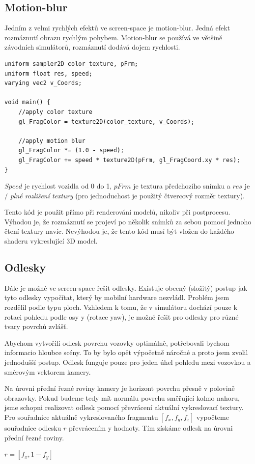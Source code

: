 \documentclass[11pt,twoside,a4paper]{book}
\begin{document}
\subsection{Motion-blur}
Jedním z velmi rychlých efektů ve screen-space je motion-blur. Jedná efekt rozmáznutí obrazu rychlým pohybem. Motion-blur se používá ve většině závodních simulátorů, rozmáznutí dodává dojem rychlosti.
\lstset{language=GLSL} 
\begin{lstlisting}[caption=Motion blur fragment shader dle rychlosti vozidla]
uniform sampler2D color_texture, pFrm;
uniform float res, speed;
varying vec2 v_Coords;

void main() {
	//apply color texture
	gl_FragColor = texture2D(color_texture, v_Coords); 

	//apply motion blur
	gl_FragColor *= (1.0 - speed);
	gl_FragColor += speed * texture2D(pFrm, gl_FragCoord.xy * res);
}
\end{lstlisting}

$Speed$ je rychlost vozidla od 0 do 1, $pFrm$ je textura předchozího snímku a $res$ je / \textit{plné rozlišení textury} (pro jednoduchost je použitý čtvercový rozměr textury).

Tento kód je použit přímo při renderování modelů, nikoliv při postprocesu. Výhodou je, že rozmáznutí se projeví po několik snímků za sebou pomocí jednoho čtení textury navíc. Nevýhodou je, že tento kód musí být vložen do každého shaderu vykreslující 3D model.
\newpage

\subsection{Odlesky}
Dále je možné ve screen-space řešit odlesky. Existuje obecný (složitý) postup jak tyto odlesky vypočítat, který by mobilní hardware nezvládl. Problém jsem rozdělil podle typu ploch. Vzhledem k tomu, že v simulátoru dochází pouze k rotaci pohledu podle osy y (rotace yaw), je možné řešit pro odlesky pro různé tvary povrchů zvlášť.

Abychom vytvořili odlesk povrchu vozovky optimálně, potřebovali bychom informaci\linebreak o hloubce scény. To by bylo opět výpočetně náročné a proto jsem zvolil jednodušší postup. Odlesk funguje pouze pro jeden úhel pohledu mezi vozovkou a směrovým vektorem kamery.

Na úrovni přední řezné roviny kamery je horizont povrchu přesně v polovině obrazovky. Pokud budeme tedy mít normálu povrchu směřující kolmo nahoru, jsme schopni realizovat odlesk pomocí převrácení aktuální vykreslovací textury. Pro souřadnice aktuálně vykreslovaného fragmentu $[f_x, f_y, f_z]$ vypočteme souřadnice odlesku $r$ převrácením y hodnoty. Tím získáme odlesk na úrovni  přední řezné roviny.
\begin{center}
$r = [f_x, 1 - f_y]$
\end{center}
\end{document}
